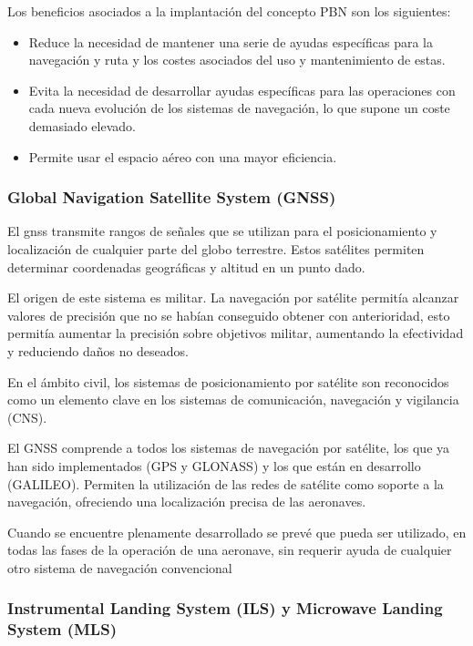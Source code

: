 Los beneficios asociados a la implantación del concepto PBN son los siguientes:

\begin{itemize}
    \item Reduce la necesidad de mantener una serie de ayudas específicas para la navegación y ruta y los costes asociados del uso y mantenimiento de estas.
    \item Evita la necesidad de desarrollar ayudas específicas para las operaciones con cada nueva evolución de los sistemas de navegación, lo que supone un coste demasiado elevado.
    \item Permite usar el espacio aéreo con una mayor eficiencia.
\end{itemize}

\subsubsection{Global Navigation Satellite System (GNSS)}

El \acrfull{gnss} transmite rangos de señales que se utilizan para el posicionamiento y localización de cualquier parte del globo terrestre. Estos satélites permiten determinar coordenadas geográficas y altitud en un punto dado.

El origen de este sistema es militar. La navegación por satélite permitía alcanzar valores de precisión que no se habían conseguido obtener con anterioridad, esto permitía aumentar la precisión sobre objetivos militar, aumentando la efectividad y reduciendo daños no deseados.

En el ámbito civil, los sistemas de posicionamiento por satélite son reconocidos como un elemento clave en los sistemas de comunicación, navegación y vigilancia (CNS). 

El GNSS comprende a todos los sistemas de navegación por satélite, los que ya han sido implementados (GPS y GLONASS) y los que están en desarrollo (GALILEO). Permiten la utilización de las redes de satélite como soporte a la navegación, ofreciendo una localización precisa de las aeronaves.

Cuando se encuentre plenamente desarrollado se prevé que pueda ser utilizado, en todas las fases de la operación de una aeronave, sin requerir ayuda de cualquier otro sistema de navegación convencional

\subsubsection{Instrumental Landing System (ILS) y Microwave Landing System (MLS)}

